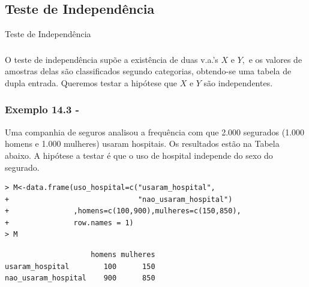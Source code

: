 \documentclass[14pt,aspectratio=1610]{beamer}
\begin{document}
\subsection{Teste de Independência}
\begin{frame}{Teste de Independência}
\frametitle{}
\begin{block}{}
\justifying
O teste de independência supõe a existência de duas v.a.’s $X$ e $Y,$ e os valores de amostras delas são classificados segundo categorias, obtendo-se uma tabela de dupla entrada. Queremos testar a hipótese que $X$ e $Y$ são independentes.
\end{block}
\end{frame}

\begin{frame}[fragile]{}
\frametitle{Exemplo 14.3 - \cite{Morettin09}}
\begin{block}{}
\justifying
Uma companhia de seguros analisou a frequência com que 2.000 segurados (1.000 homens e 1.000 mulheres) usaram hospitais. Os resultados estão na Tabela abaixo. A hipótese a testar é que o uso de hospital independe do sexo do segurado.
\begin{verbatim}
> M<-data.frame(uso_hospital=c("usaram_hospital", 
+                              "nao_usaram_hospital")
+               ,homens=c(100,900),mulheres=c(150,850), 
+               row.names = 1)
> M    
\end{verbatim}

\begin{verbatim}
                    homens mulheres
usaram_hospital        100      150
nao_usaram_hospital    900      850    
\end{verbatim}

\end{block}
\end{frame}
\end{document}
